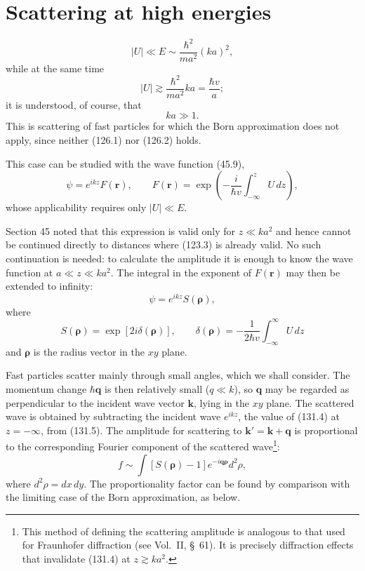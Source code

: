 \section{Scattering at high energies}


\begin{equation}
 |U|\ll E\sim\frac{\hbar^2}{ma^2}(ka)^2,
 \tag{131.1}
\end{equation}
while at the same time
\begin{equation}
 |U|\gtrsim\frac{\hbar^2}{ma^2}ka=\frac{\hbar v}{a};
 \tag{131.2}
\end{equation}
it is understood, of course, that
\begin{equation}
 ka\gg1.
 \tag{131.3}
\end{equation}
This is scattering of fast particles for which the Born approximation does not
apply, since neither (126.1) nor (126.2) holds.

This case can be studied with the wave function (45.9),
\begin{equation}
 \psi=e^{ikz}F(\mathbf r),\qquad
 F(\mathbf r)=\exp\left(-\frac{i}{\hbar v}
 \int_{-\infty}^{z}U\,dz\right),
 \tag{131.4}
\end{equation}
whose applicability requires only $|U|\ll E$.

Section 45 noted that this expression is valid only for $z\ll ka^2$ and hence
cannot be continued directly to distances where (123.3) is already valid. No
such continuation is needed: to calculate the amplitude it is enough to know
the wave function at $a\ll z\ll ka^2$. The integral in the exponent of
$F(\mathbf r)$ may then be extended to infinity:
\begin{equation}
 \psi=e^{ikz}S(\boldsymbol\rho),
 \tag{131.5}
\end{equation}
where
\begin{equation}
 S(\boldsymbol\rho)=\exp[2i\delta(\boldsymbol\rho)],\qquad
 \delta(\boldsymbol\rho)=-\frac1{2\hbar v}
 \int_{-\infty}^{\infty}U\,dz
 \tag{131.6}
\end{equation}
and $\boldsymbol\rho$ is the radius vector in the $xy$ plane.

Fast particles scatter mainly through small angles, which we shall consider.
The momentum change $\hbar\mathbf q$ is then relatively small ($q\ll k$), so
$\mathbf q$ may be regarded as perpendicular to the incident wave vector
$\mathbf k$, lying in the $xy$ plane. The scattered wave is obtained by
subtracting the incident wave $e^{ikz}$, the value of (131.4) at $z=-\infty$,
from (131.5). The amplitude for scattering to
$\mathbf k'=\mathbf k+\mathbf q$ is proportional to the corresponding Fourier
component of the scattered wave\footnote{This method of defining the
scattering amplitude is analogous to that used for Fraunhofer diffraction
(see Vol.~II, \S~61). It is precisely diffraction effects that invalidate
(131.4) at $z\gtrsim ka^2$.}:
\[
 f\sim\int[S(\boldsymbol\rho)-1]e^{-i\mathbf{q\rho}}d^2\rho,
\]
where $d^2\rho=dx\,dy$. The proportionality factor can be found by comparison
with the limiting case of the Born approximation, as below.

